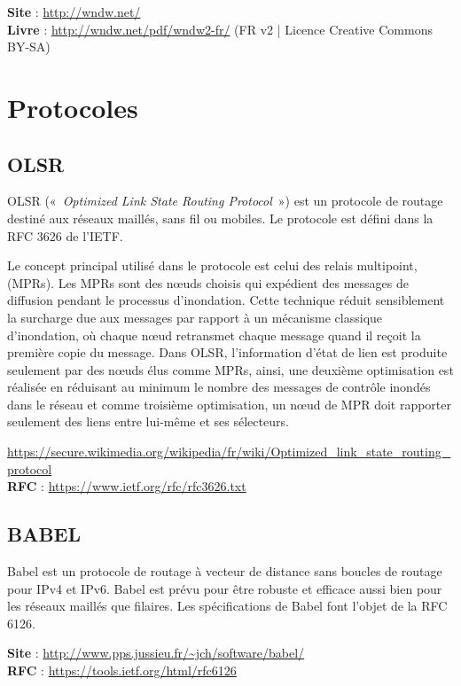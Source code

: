 \documentclass[a4paper,french,11pt,twoside]{article}
\begin{document}
\noindent \textbf{Site} : \url{http://wndw.net/} \\ 
\noindent \textbf{Livre}  : \url{http://wndw.net/pdf/wndw2-fr/} (FR v2 | Licence Creative Commons BY-SA)

\section{Protocoles}
\subsection{OLSR} \label{olsr}

OLSR («~\textit{Optimized Link State Routing Protocol}~») est un protocole de routage destiné aux réseaux maillés, sans fil ou mobiles. Le protocole est défini dans la RFC 3626 de l'IETF.

\medskip
Le concept principal utilisé dans le protocole est celui des relais multipoint, (MPRs). Les MPRs sont des nœuds choisis qui expédient des messages de diffusion pendant le processus d'inondation. Cette technique réduit sensiblement la surcharge due aux messages par rapport à un mécanisme classique d'inondation, où chaque nœud retransmet chaque message quand il reçoit la première copie du message. Dans OLSR, l'information d'état de lien est produite seulement par des nœuds élus comme MPRs, ainsi, une deuxième optimisation est réalisée en réduisant au minimum le nombre des messages de contrôle inondés dans le réseau et comme troisième optimisation, un nœud de MPR doit rapporter seulement des liens entre lui-même et ses sélecteurs.

\medskip
\noindent \url{https://secure.wikimedia.org/wikipedia/fr/wiki/Optimized_link_state_routing_protocol} \\
\noindent \textbf{RFC} :  \url{https://www.ietf.org/rfc/rfc3626.txt}

\subsection{BABEL} \label{babel}

Babel est un protocole de routage à vecteur de distance sans boucles de routage pour IPv4 et IPv6. Babel est prévu pour être robuste et efficace aussi bien pour les réseaux maillés que filaires. Les spécifications de Babel font l'objet de la RFC 6126.

\medskip
\noindent \textbf{Site} : \url{http://www.pps.jussieu.fr/~jch/software/babel/}\\
\noindent \textbf{RFC} : \url{https://tools.ietf.org/html/rfc6126}
\end{document}
